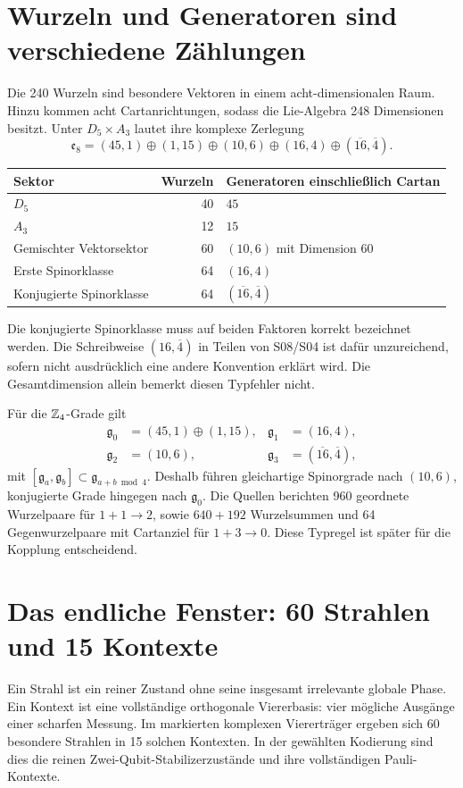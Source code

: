\section{Wurzeln und Generatoren sind verschiedene Zählungen}


Die 240 Wurzeln sind besondere Vektoren in einem acht-dimensionalen Raum. Hinzu kommen acht Cartanrichtungen, sodass die Lie-Algebra 248 Dimensionen besitzt. Unter $D_5\times A_3$ lautet ihre komplexe Zerlegung
\begin{equation}
\mathfrak e_8=(45,1)\oplus(1,15)\oplus(10,6)
\oplus(16,4)\oplus(\overline{16},\overline4).
\label{eq:branch}
\end{equation}
\par\noindent\begin{tabularx}{\linewidth}{L{47mm}rY}
\toprule
\textbf{Sektor}&\textbf{Wurzeln}&\textbf{Generatoren einschließlich Cartan}\\\midrule
$D_5$&40&$45$\\
$A_3$&12&$15$\\
Gemischter Vektorsektor&60&$(10,6)$ mit Dimension $60$\\
Erste Spinorklasse&64&$(16,4)$\\
Konjugierte Spinorklasse&64&$(\overline{16},\overline4)$\\\bottomrule
\end{tabularx}\par

Die konjugierte Spinorklasse muss auf beiden Faktoren korrekt bezeichnet werden. Die Schreibweise $(16,\overline4)$ in Teilen von S08/S04 ist dafür unzureichend, sofern nicht ausdrücklich eine andere Konvention erklärt wird. Die Gesamtdimension allein bemerkt diesen Typfehler nicht.

Für die $\mathbb Z_4$-Grade gilt
\begin{align}
\mathfrak g_0&=(45,1)\oplus(1,15),&\mathfrak g_1&=(16,4),\\
\mathfrak g_2&=(10,6),&\mathfrak g_3&=(\overline{16},\overline4),
\end{align}
mit $[\mathfrak g_a,\mathfrak g_b]\subset\mathfrak g_{a+b\bmod4}$. Deshalb führen gleichartige Spinorgrade nach $(10,6)$, konjugierte Grade hingegen nach $\mathfrak g_0$. Die Quellen berichten 960 geordnete Wurzelpaare für $1+1\to2$, sowie $640+192$ Wurzelsummen und 64 Gegenwurzelpaare mit Cartanziel für $1+3\to0$. Diese Typregel ist später für die Kopplung entscheidend.

\section{Das endliche Fenster: 60 Strahlen und 15 Kontexte}
Ein Strahl ist ein reiner Zustand ohne seine insgesamt irrelevante globale Phase. Ein Kontext ist eine vollständige orthogonale Viererbasis: vier mögliche Ausgänge einer scharfen Messung. Im markierten komplexen Viererträger ergeben sich 60 besondere Strahlen in 15 solchen Kontexten. In der gewählten Kodierung sind dies die reinen Zwei-Qubit-Stabilizerzustände und ihre vollständigen Pauli-Kontexte. 

